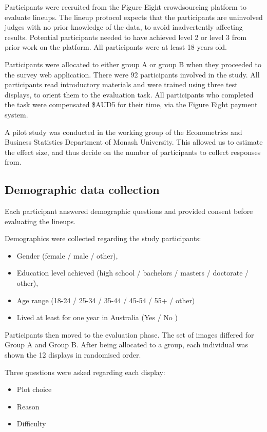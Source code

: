 \documentclass[times, doublespace]{anzsauth}
\begin{document}
Participants were recruited from the Figure Eight crowdsourcing platform
\citep{figeight} to evaluate lineups. The lineup
protocol expects that the participants are uninvolved judges with no
prior knowledge of the data, to avoid inadvertently affecting results.
Potential participants needed to have achieved level 2 or level 3 from
prior work on the platform. All participants were at least 18 years old.

Participants were allocated to either group A or group B when they
proceeded to the survey web application. There were 92 participants
involved in the study. All participants read introductory materials and
were trained using three test displays, to orient them to the evaluation
task. All participants who completed the task were compensated \$AUD5
for their time, via the Figure Eight payment system.

A pilot study was conducted in the working group of the Econometrics and
Business Statistics Department of Monash University. This allowed us to
estimate the effect size, and thus decide on the number of participants to
collect responses from.

\subsection{Demographic data
collection}\label{demographic-data-collection}

Each participant answered demographic questions and provided consent
before evaluating the lineups.

Demographics were collected regarding the study participants:

\begin{itemize}
 \item
  Gender (female / male / other),
\item
  Education level achieved (high school / bachelors / masters /
  doctorate / other),
\item
  Age range (18-24 / 25-34 / 35-44 / 45-54 / 55+ / other)
\item
  Lived at least for one year in Australia (Yes / No )
\end{itemize}

Participants then moved to the evaluation phase. The set of images
differed for Group A and Group B. After being allocated to a group, each
individual was shown the 12 displays in randomised order.

Three questions were asked regarding each display:

\begin{itemize}
 \item
  Plot choice
\item
  Reason
\item
  Difficulty
\end{itemize}
\end{document}
